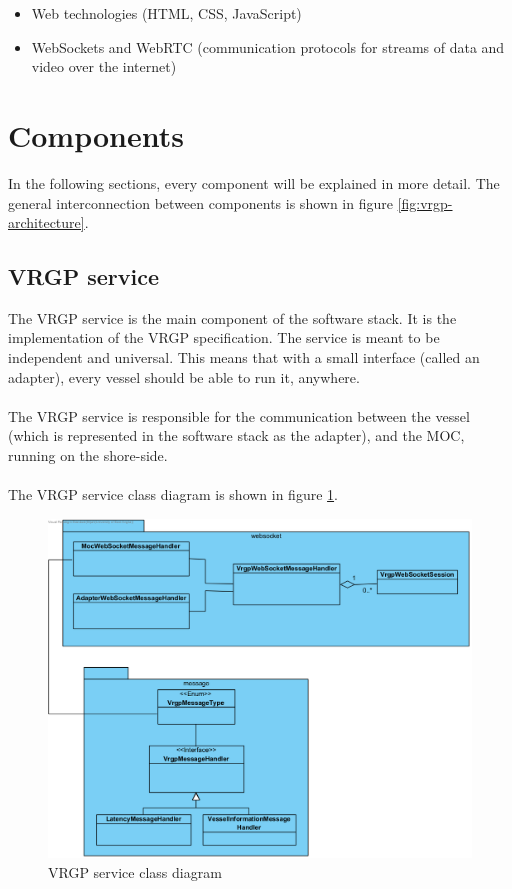 \begin{itemize}
	\item Web technologies (HTML, CSS, JavaScript)
	\item WebSockets and WebRTC (communication protocols for streams of data and video over the internet)
\end{itemize}

\section{Components}\label{sec:components}

In the following sections, every component will be explained in more detail. The general interconnection between components is shown in figure \ref{fig:vrgp-architecture}.

\subsection{VRGP service}

The VRGP service is the main component of the software stack. It is the implementation of the VRGP specification. The service is meant to be independent and universal. This means that with a small interface (called an adapter), every vessel should be able to run it, anywhere.
\\\\
The VRGP service is responsible for the communication between the vessel (which is represented in the software stack as the adapter), and the MOC, running on the shore-side.
\\\\
The VRGP service class diagram is shown in figure \ref{fig:vrgp-service-class-diagram}.

\begin{figure}[ht]
	\centering
	\includegraphics[width=\linewidth]{diagrams/vrgp_class_diagram}
	\caption{VRGP service class diagram}
    \label{fig:vrgp-service-class-diagram}
\end{figure}

